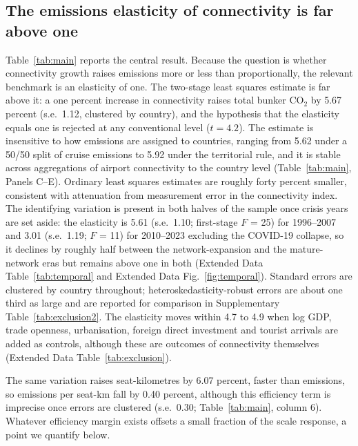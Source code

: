 \documentclass[12pt]{article}
\begin{document}
\subsection*{The emissions elasticity of connectivity is far above one}
Table~\ref{tab:main} reports the central result. Because the question is
whether connectivity growth raises emissions more or less than
proportionally, the relevant benchmark is an elasticity of one. The
two-stage least squares estimate is far above it: a one percent increase in
connectivity raises total bunker CO$_2$ by 5.67 percent (s.e.\ 1.12,
clustered by country), and the hypothesis that the elasticity equals one
is rejected at any conventional level ($t = 4.2$). The estimate is insensitive to how emissions are
assigned to countries, ranging from 5.62 under a 50/50 split of cruise
emissions to 5.92 under the territorial rule, and it is stable across
aggregations of airport connectivity to the country level
(Table~\ref{tab:main}, Panels C--E). Ordinary least squares estimates are
roughly forty percent smaller, consistent with attenuation from measurement
error in the connectivity index. The identifying variation is present in
both halves of the sample once crisis years are set aside: the elasticity
is 5.61 (s.e.\ 1.10; first-stage $F$ = 25) for 1996--2007 and 3.01 (s.e.\
1.19; $F$ = 11) for 2010--2023 excluding the COVID-19 collapse, so it
declines by roughly half between the network-expansion and the
mature-network eras but remains above one in both (Extended Data
Table~\ref{tab:temporal} and Extended Data Fig.~\ref{fig:temporal}).
Standard errors are clustered by country throughout; heteroskedasticity-robust
errors are about one third as large and are reported for comparison in
Supplementary Table~\ref{tab:exclusion2}. The elasticity moves within 4.7
to 4.9 when log GDP, trade openness, urbanisation, foreign direct
investment and tourist arrivals are added as controls, although these are
outcomes of connectivity themselves (Extended Data
Table~\ref{tab:exclusion}).

The same variation raises seat-kilometres by 6.07 percent, faster than
emissions, so emissions per seat-km fall by 0.40 percent, although this
efficiency term is imprecise once errors are clustered (s.e.\ 0.30;
Table~\ref{tab:main}, column 6). Whatever efficiency margin exists offsets
a small fraction of the scale response, a point we quantify below.

\end{document}
